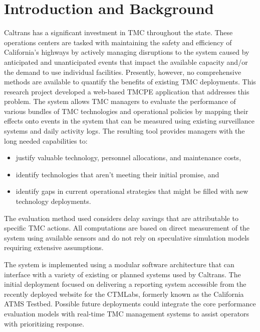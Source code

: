 \documentclass[12pt]{report}
\newcounter{time}
\begin{document}
\acresetall

\setcounter{page}{0}

\chapter{Introduction and Background}
\label{sec:intro}


Caltrans has a significant investment in \ac{TMC} throughout the
state. These operations centers are tasked with maintaining the safety
and efficiency of California's highways by actively managing
disruptions to the system caused by anticipated and unanticipated
events that impact the available capacity and/or the demand to use
individual facilities.  Presently, however, no comprehensive methods
are available to quantify the benefits of existing \ac{TMC}
deployments. This research project developed a web-based \ac{TMCPE}
application that addresses this problem. The system allows \ac{TMC}
managers to evaluate the performance of various bundles of \ac{TMC}
technologies and operational policies by mapping their effects onto
events in the system that can be measured using existing surveillance
systems and daily activity logs. The resulting tool provides managers
with the long needed capabilities to:
\begin{itemize}
\item justify valuable technology, personnel allocations, and
  maintenance costs,
\item identify technologies that aren't meeting their initial promise,
  and
\item identify gaps in current operational strategies that might be
  filled with new technology deployments.
\end{itemize}
The evaluation method used considers delay savings that are
attributable to specific \ac{TMC} actions.  All computations are based
on direct measurement of the system using available sensors and do not
rely on speculative simulation models requiring extensive assumptions.

The system is implemented using a modular software architecture that
can interface with a variety of existing or planned systems used by
Caltrans. The initial deployment focused on delivering a reporting
system accessible from the recently deployed website for the
\ac{CTMLabs}, formerly known as the California \ac{ATMS}
Testbed. Possible future deployments could integrate the core
performance evaluation models with real-time \ac{TMC} management
systems to assist operators with prioritizing response.
\end{document}
